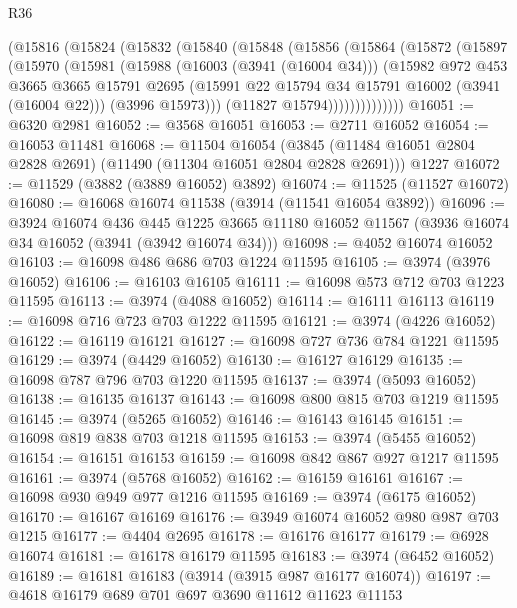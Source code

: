 \begin{lexlean}{R36}
\begin{coremodule}
        (@15816
          (@15824
            (@15832
              (@15840
                (@15848
                  (@15856
                    (@15864
                      (@15872
                        (@15897
                          (@15970
                            (@15981
                              (@15988
                                (@16003 (@3941 (@16004 @34)))
                                (@15982
                                  @972
                                  @453
                                  @3665
                                  @3665
                                  @15791
                                  @2695
                                  (@15991 @22 @15794 @34 @15791 @16002 (@3941 (@16004 @22)))
                                  (@3996 @15973)))
                              (@11827 @15794))))))))))))))
@16051 := @6320 @2981
@16052 := @3568 @16051
@16053 := @2711 @16052
@16054 := @16053 @11481
@16068 := @11504
    @16054
    (@3845 (@11484 @16051 @2804 @2828 @2691) (@11490 (@11304 @16051 @2804 @2828 @2691)))
    @1227
@16072 := @11529 (@3882 (@3889 @16052) @3892)
@16074 := @11525 (@11527 @16072)
@16080 := @16068 @16074 @11538 (@3914 (@11541 @16054 @3892))
@16096 := @3924
    @16074
    @436
    @445
    @1225
    @3665
    @11180
    @16052
    @11567
    (@3936 @16074 @34 @16052 (@3941 (@3942 @16074 @34)))
@16098 := @4052 @16074 @16052
@16103 := @16098 @486 @686 @703 @1224 @11595
@16105 := @3974 (@3976 @16052)
@16106 := @16103 @16105
@16111 := @16098 @573 @712 @703 @1223 @11595
@16113 := @3974 (@4088 @16052)
@16114 := @16111 @16113
@16119 := @16098 @716 @723 @703 @1222 @11595
@16121 := @3974 (@4226 @16052)
@16122 := @16119 @16121
@16127 := @16098 @727 @736 @784 @1221 @11595
@16129 := @3974 (@4429 @16052)
@16130 := @16127 @16129
@16135 := @16098 @787 @796 @703 @1220 @11595
@16137 := @3974 (@5093 @16052)
@16138 := @16135 @16137
@16143 := @16098 @800 @815 @703 @1219 @11595
@16145 := @3974 (@5265 @16052)
@16146 := @16143 @16145
@16151 := @16098 @819 @838 @703 @1218 @11595
@16153 := @3974 (@5455 @16052)
@16154 := @16151 @16153
@16159 := @16098 @842 @867 @927 @1217 @11595
@16161 := @3974 (@5768 @16052)
@16162 := @16159 @16161
@16167 := @16098 @930 @949 @977 @1216 @11595
@16169 := @3974 (@6175 @16052)
@16170 := @16167 @16169
@16176 := @3949 @16074 @16052 @980 @987 @703 @1215
@16177 := @4404 @2695
@16178 := @16176 @16177
@16179 := @6928 @16074
@16181 := @16178 @16179 @11595
@16183 := @3974 (@6452 @16052)
@16189 := @16181 @16183 (@3914 (@3915 @987 @16177 @16074))
@16197 := @4618 @16179 @689 @701 @697 @3690 @11612 @11623 @11153

\end{coremodule}
\end{lexlean}
